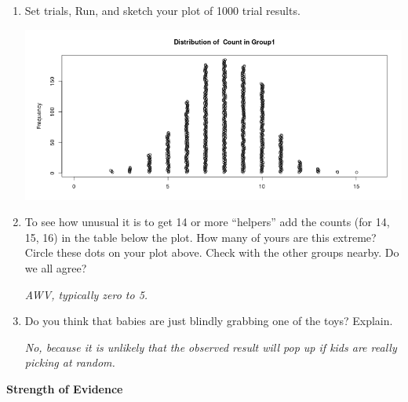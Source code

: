 \begin{enumerate}
\begin{key}
{\it 12 in my first, 8 in my second }
\end{key}

    \item  Set   trials, Run, and   
              sketch your plot of 1000 trial results. 
\begin{students}
  \vspace{4cm}
\end{students}

\begin{key}
    \includegraphics[width=.8\linewidth]{plots/Helper16.png}
\end{key}
\item To see how unusual it is to get 14 or more ``helpers'' add the
  counts (for 14, 15, 16) in the table below the plot.
   How many of yours are this extreme? Circle
  these dots on your plot above. Check with the other groups
  nearby. Do we all agree?
\begin{students}
  \vspace{1.5cm}
\end{students}

\begin{key}
{\it  AWV, typically zero to 5.
}
\end{key}
\item  Do you think that babies are just blindly grabbing one of
      the toys? Explain.
\begin{students}
  \vspace{2.5cm}
\end{students}

\begin{key}
  {\it No, because it is unlikely that the observed result will pop up
    if  kids are really picking at random. }
\end{key}

  \end{enumerate}
\begin{center}
        {\large\bf Strength of Evidence}
 \end{center}
